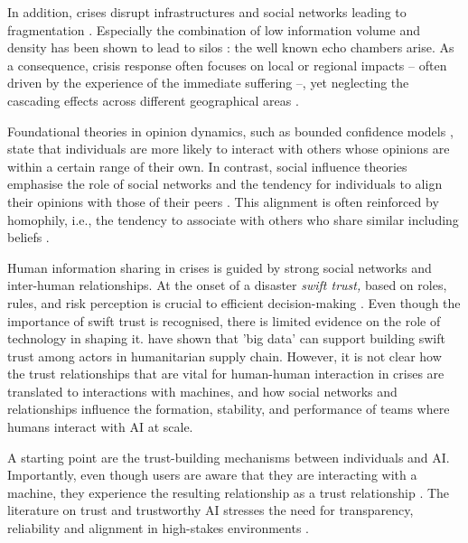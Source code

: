 \documentclass[pdflatex,sn-apa]{sn-jnl}%
\begin{document}
In addition, crises disrupt infrastructures and social networks leading to fragmentation \citep{wolbers2018introducing}. Especially the combination of low information volume and density has been shown to lead to silos \citep{pan2012crisis}: the well known echo chambers arise. As a consequence, crisis response often focuses on local or regional impacts -- often driven by the experience of the immediate suffering --, yet neglecting the cascading effects across different geographical areas \citep{sigala2022mitigating}.

Foundational theories in opinion dynamics, such as bounded confidence models \citep{hegselmann2002opinion}, state that individuals are more likely to interact with others whose opinions are within a certain range of their own. In contrast, social influence theories emphasise the role of social networks and the tendency for individuals to align their opinions with those of their peers \citep{friedkin1999social}. This alignment is often reinforced by homophily, i.e., the tendency to associate with others who share similar including beliefs \citep{mcpherson2001birds}.

Human information sharing in crises is guided by strong social networks and inter-human relationships. At the onset of a disaster \textit{swift trust,} based on roles, rules, and risk perception is crucial to efficient decision-making \citep{tatham2010application}. Even though the importance of swift trust is recognised, there is limited evidence on the role of technology in shaping it. \citet{dubey2018big} have shown that 'big data' can support building swift trust among actors in humanitarian supply chain. However, it is not clear how the trust relationships that are vital for human-human interaction in crises are translated to interactions with machines, and how social networks and relationships influence the formation, stability, and performance of teams where humans interact with AI at scale. 

A starting point are the trust-building mechanisms between individuals and AI. Importantly, even though users are aware that they are interacting with a machine, they experience the resulting relationship as a trust relationship \citep{manzini2024should}. The literature on trust and trustworthy AI stresses the need for transparency, reliability and alignment in high-stakes environments \citep{lee2004trust, glikson2020human}.
\end{document}
